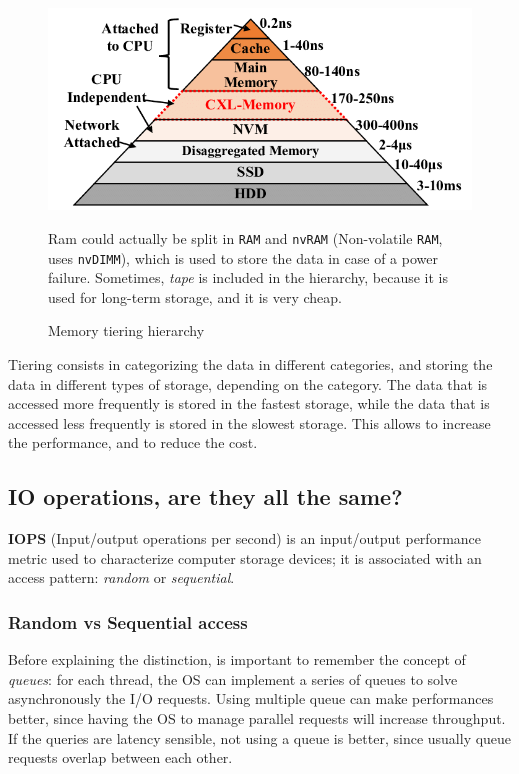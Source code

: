 \begin{figure}[htbp]
   \centering
   \includegraphics{images/tiering_memory.png}
   \caption{Memory tiering hierarchy}
   Ram could actually be split in \texttt{RAM} and \texttt{nvRAM} (Non-volatile \texttt{RAM}, uses \texttt{nvDIMM}), which is used to store the data in case of a power failure.
   Sometimes, \textit{tape} is included in the hierarchy, because it is used for long-term storage, and it is very cheap.
   \label{fig:tiering_memory}
\end{figure}

Tiering consists in categorizing the data in different categories, and storing the data in different types of storage, depending on the category. The data that is accessed more frequently is stored in the fastest storage, while the data that is accessed less frequently is stored in the slowest storage. This allows to increase the performance, and to reduce the cost. 

\subsection{IO operations, are they all the same?}
\textbf{IOPS} (Input/output operations per second) is an input/output
performance metric used to characterize computer storage devices; it is associated with an access pattern: \textit{random} or \textit{sequential}.

\subsubsection{Random vs Sequential access}

Before explaining the distinction, is important to remember the concept of \textit{queues}: for each thread, the OS can implement a series of queues to solve asynchronously the I/O requests. Using multiple queue can make performances better, since having
the OS to manage parallel requests will increase throughput.
If the queries are latency sensible, not using a queue is better, since
usually queue requests overlap between each other.

